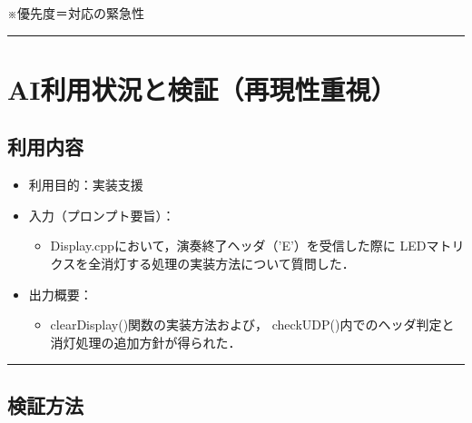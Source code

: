 \documentclass[uplatex,dvipdfmx,a4paper,11pt]{jsarticle}
\newcommand{\sectionrule}{\par\medskip\noindent\rule{\linewidth}{0.6pt}\par\medskip}
\begin{document}
※優先度＝対応の緊急性

\sectionrule


\section{AI利用状況と検証（再現性重視）}

\subsection{利用内容}

\begin{itemize}
  \item 利用目的：実装支援

  \item 入力（プロンプト要旨）：
    \begin{itemize}
      \item Display.cppにおいて，演奏終了ヘッダ（'E'）を受信した際に
      LEDマトリクスを全消灯する処理の実装方法について質問した．
    \end{itemize}

  \item 出力概要：
    \begin{itemize}
      \item clearDisplay()関数の実装方法および，
      checkUDP()内でのヘッダ判定と消灯処理の追加方針が得られた．
    \end{itemize}
\end{itemize}

\sectionrule

\subsection{検証方法}
\end{document}
